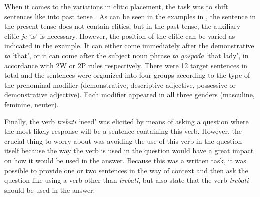 \documentclass[output=paper,
modfonts,
newtxmath,
hidelinks,
]{langscibook}
\begin{document}
\z

\noindent When it comes to the variations in clitic placement, the task was to shift sentences like  into past tense . As can be seen in the examples in , the sentence in the present tense does not contain clitics, but in the past tense, the auxiliary clitic \textit{je} `is' is necessary. However, the position of the clitic can be varied as indicated in the example. It can either come immediately after the demonstrative \textit{ta} `that’, or it can come after the subject noun phrase \textit{ta gospođa} `that lady', in accordance with 2W or 2P rules respectively. There were 12 target sentences in total and the sentences were organized into four groups according to the type of the prenominal modifier (demonstrative, descriptive adjective, possessive or demonstrative adjective). Each modifier appeared in all three genders (masculine, feminine, neuter).

\ea \label{ex6}
	\z
\z

\noindent Finally, the verb \textit{trebati} `need' was elicited by means of asking a question where the most likely response will be a sentence containing this verb. However, the crucial thing to worry about was avoiding the use of this verb in the question itself because the way the verb is used in the question would have a great impact on how it would be used in the answer. Because this was a written task, it was possible to provide one or two sentences in the way of context and then ask the question like  using a verb other than \textit{trebati}, but also state that the verb \textit{trebati} should be used in the answer. 
\end{document}

